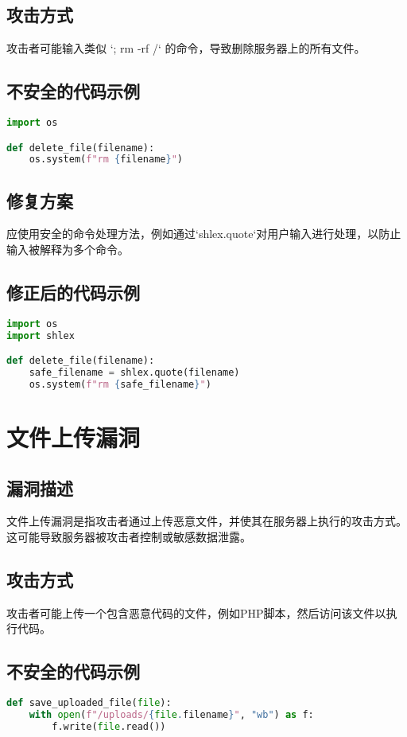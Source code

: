 \documentclass{article}
\begin{document}
\subsection{攻击方式}
攻击者可能输入类似 `; rm -rf /` 的命令，导致删除服务器上的所有文件。

\subsection{不安全的代码示例}
\begin{lstlisting}[language=Python, caption=存在命令注入漏洞的代码]
import os

def delete_file(filename):
    os.system(f"rm {filename}")
\end{lstlisting}

\subsection{修复方案}
应使用安全的命令处理方法，例如通过`shlex.quote`对用户输入进行处理，以防止输入被解释为多个命令。

\subsection{修正后的代码示例}
\begin{lstlisting}[language=Python, caption=经过安全处理的命令执行代码]
import os
import shlex

def delete_file(filename):
    safe_filename = shlex.quote(filename)
    os.system(f"rm {safe_filename}")
\end{lstlisting}

\section{文件上传漏洞}

\subsection{漏洞描述}
文件上传漏洞是指攻击者通过上传恶意文件，并使其在服务器上执行的攻击方式。这可能导致服务器被攻击者控制或敏感数据泄露。

\subsection{攻击方式}
攻击者可能上传一个包含恶意代码的文件，例如PHP脚本，然后访问该文件以执行代码。

\subsection{不安全的代码示例}
\begin{lstlisting}[language=Python, caption=存在文件上传漏洞的代码]
def save_uploaded_file(file):
    with open(f"/uploads/{file.filename}", "wb") as f:
        f.write(file.read())
\end{lstlisting}
\end{document}
